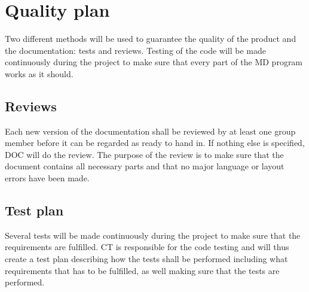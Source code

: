 \section{Quality plan}
Two different methods will be used to guarantee the quality of the product and the documentation: tests and reviews. Testing of the code will be made continuously during the project to make sure that every part of the MD program works as it should.

\subsection{Reviews}

Each new version of the documentation shall be reviewed by at least one group member before it can be regarded as ready to hand in. If nothing else is specified, DOC will do the review. The purpose of the review is to make sure that the document contains all necessary parts and that no major language or layout errors have been made.

\subsection{Test plan}

Several tests will be made continuously during the project to make sure that the requirements are fulfilled. CT is responsible for the code testing and will thus create a test plan describing how the tests shall be performed including what requirements that has to be fulfilled, as well making sure that the tests are performed.
